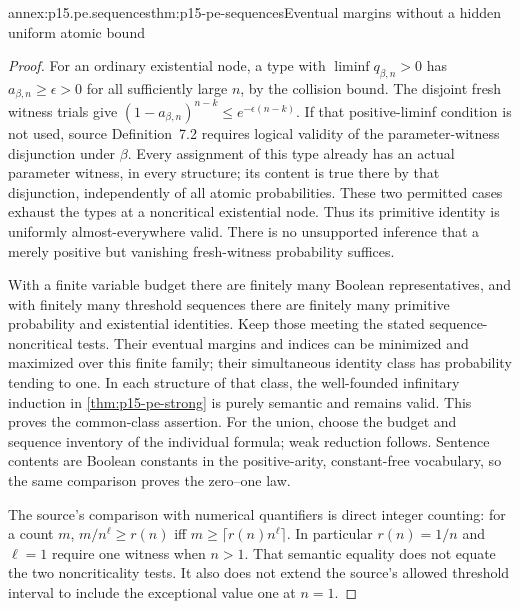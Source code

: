 \begin{annexitem}{annex:p15.pe.sequences}{thm:p15-pe-sequences}{Eventual margins without a hidden uniform atomic bound}
\begin{proof}
For an ordinary existential node, a type with
\(\liminf q_{\beta,n}>0\) has
\(a_{\beta,n}\ge\epsilon>0\) for all sufficiently large \(n\),
by the collision bound. The disjoint fresh witness trials give
\((1-a_{\beta,n})^{n-k}\le e^{-\epsilon(n-k)}\).
If that positive-liminf condition is not used, source
Definition~7.2 requires logical validity of the parameter-witness
disjunction under \(\beta\). Every assignment of this type already
has an actual parameter witness, in every structure; its content
is true there by that disjunction, independently of all atomic
probabilities. These two permitted cases exhaust the types at a
noncritical existential node. Thus its primitive identity is uniformly
almost-everywhere valid. There is no unsupported inference that a
merely positive but vanishing fresh-witness probability suffices.

With a finite variable budget there are finitely many Boolean
representatives, and with finitely many threshold sequences there
are finitely many primitive probability and existential identities.
Keep those meeting the stated sequence-noncritical tests. Their
eventual margins and indices can be minimized and maximized over
this finite family; their simultaneous identity class has probability
tending to one. In each structure of that class, the well-founded
infinitary induction in \cref{thm:p15-pe-strong} is purely semantic
and remains valid. This proves the common-class assertion.
For the union, choose the budget and sequence inventory of the
individual formula; weak reduction follows. Sentence contents are
Boolean constants in the positive-arity, constant-free vocabulary,
so the same comparison proves the zero--one law.

The source's comparison with numerical quantifiers is direct integer
counting: for a count \(m\),
\(m/n^\ell\ge r(n)\) iff
\(m\ge\lceil r(n)n^\ell\rceil\). In particular \(r(n)=1/n\)
and \(\ell=1\) require one witness when \(n>1\).
That semantic equality does not equate the two noncriticality tests.
It also does not extend the source's allowed threshold interval to
include the exceptional value one at \(n=1\).
\end{proof}
\end{annexitem}
